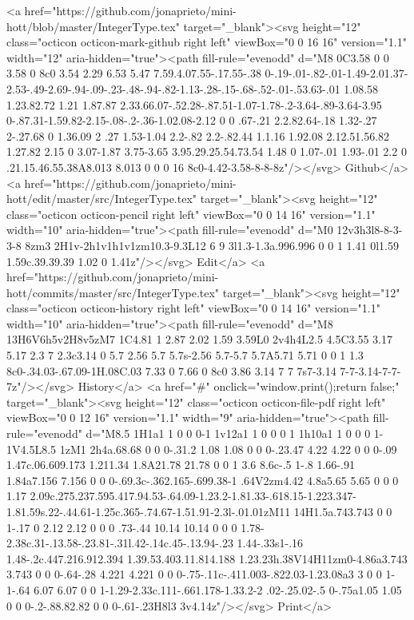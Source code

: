       <a href="https://github.com/jonaprieto/mini-hott/blob/master/IntegerType.tex" target="_blank"><svg height="12" class="octicon octicon-mark-github right left" viewBox="0 0 16 16" version="1.1" width="12" aria-hidden="true"><path fill-rule="evenodd" d="M8 0C3.58 0 0 3.58 0 8c0 3.54 2.29 6.53 5.47 7.59.4.07.55-.17.55-.38 0-.19-.01-.82-.01-1.49-2.01.37-2.53-.49-2.69-.94-.09-.23-.48-.94-.82-1.13-.28-.15-.68-.52-.01-.53.63-.01 1.08.58 1.23.82.72 1.21 1.87.87 2.33.66.07-.52.28-.87.51-1.07-1.78-.2-3.64-.89-3.64-3.95 0-.87.31-1.59.82-2.15-.08-.2-.36-1.02.08-2.12 0 0 .67-.21 2.2.82.64-.18 1.32-.27 2-.27.68 0 1.36.09 2 .27 1.53-1.04 2.2-.82 2.2-.82.44 1.1.16 1.92.08 2.12.51.56.82 1.27.82 2.15 0 3.07-1.87 3.75-3.65 3.95.29.25.54.73.54 1.48 0 1.07-.01 1.93-.01 2.2 0 .21.15.46.55.38A8.013 8.013 0 0 0 16 8c0-4.42-3.58-8-8-8z"/></svg> Github</a>
      <a href="https://github.com/jonaprieto/mini-hott/edit/master/src/IntegerType.tex" target="_blank"><svg height="12" class="octicon octicon-pencil right left" viewBox="0 0 14 16" version="1.1" width="10" aria-hidden="true"><path fill-rule="evenodd" d="M0 12v3h3l8-8-3-3-8 8zm3 2H1v-2h1v1h1v1zm10.3-9.3L12 6 9 3l1.3-1.3a.996.996 0 0 1 1.41 0l1.59 1.59c.39.39.39 1.02 0 1.41z"/></svg> Edit</a>
      <a href="https://github.com/jonaprieto/mini-hott/commits/master/src/IntegerType.tex" target="_blank"><svg height="12" class="octicon octicon-history right left" viewBox="0 0 14 16" version="1.1" width="10" aria-hidden="true"><path fill-rule="evenodd" d="M8 13H6V6h5v2H8v5zM7 1C4.81 1 2.87 2.02 1.59 3.59L0 2v4h4L2.5 4.5C3.55 3.17 5.17 2.3 7 2.3c3.14 0 5.7 2.56 5.7 5.7s-2.56 5.7-5.7 5.7A5.71 5.71 0 0 1 1.3 8c0-.34.03-.67.09-1H.08C.03 7.33 0 7.66 0 8c0 3.86 3.14 7 7 7s7-3.14 7-7-3.14-7-7-7z"/></svg> History</a>
      <a  href="#" onclick="window.print();return false;" target="_blank"><svg height="12" class="octicon octicon-file-pdf right left" viewBox="0 0 12 16" version="1.1" width="9" aria-hidden="true"><path fill-rule="evenodd" d="M8.5 1H1a1 1 0 0 0-1 1v12a1 1 0 0 0 1 1h10a1 1 0 0 0 1-1V4.5L8.5 1zM1 2h4a.68.68 0 0 0-.31.2 1.08 1.08 0 0 0-.23.47 4.22 4.22 0 0 0-.09 1.47c.06.609.173 1.211.34 1.8A21.78 21.78 0 0 1 3.6 8.6c-.5 1-.8 1.66-.91 1.84a7.156 7.156 0 0 0-.69.3c-.362.165-.699.38-1 .64V2zm4.42 4.8a5.65 5.65 0 0 0 1.17 2.09c.275.237.595.417.94.53-.64.09-1.23.2-1.81.33-.618.15-1.223.347-1.81.59s.22-.44.61-1.25c.365-.74.67-1.51.91-2.3l-.01.01zM11 14H1.5a.743.743 0 0 1-.17 0 2.12 2.12 0 0 0 .73-.44 10.14 10.14 0 0 0 1.78-2.38c.31-.13.58-.23.81-.31l.42-.14c.45-.13.94-.23 1.44-.33s1-.16 1.48-.2c.447.216.912.394 1.39.53.403.11.814.188 1.23.23h.38V14H11zm0-4.86a3.743 3.743 0 0 0-.64-.28 4.221 4.221 0 0 0-.75-.11c-.411.003-.822.03-1.23.08a3 3 0 0 1-1-.64 6.07 6.07 0 0 1-1.29-2.33c.111-.661.178-1.33.2-2 .02-.25.02-.5 0-.75a1.05 1.05 0 0 0-.2-.88.82.82 0 0 0-.61-.23H8l3 3v4.14z"/></svg> Print</a>
